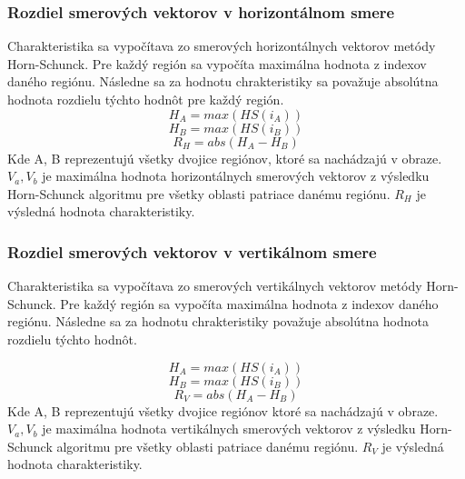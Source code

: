 \subsubsection{Rozdiel smerových vektorov v horizontálnom smere}
Charakteristika sa vypočítava zo smerových horizontálnych vektorov metódy Horn-Schunck.
Pre každý región sa vypočíta maximálna hodnota z indexov daného regiónu.
Následne sa za hodnotu chrakteristiky sa považuje absolútna hodnota rozdielu týchto hodnôt pre každý región.
\begin{equation}
  H_A = max(HS(i_A))
\end{equation}
\begin{equation}
  H_B = max(HS(i_B))
\end{equation}
\begin{equation}
  R_{H} = abs(H_A-H_B)
\end{equation}
Kde A, B reprezentujú všetky dvojice regiónov, ktoré sa nachádzajú v obraze.
\begin{math}V_a, V_b\end{math} je maximálna hodnota horizontálnych smerových vektorov z výsledku Horn-Schunck algoritmu pre všetky oblasti patriace danému regiónu.
\begin{math}R_{H}\end{math} je výsledná hodnota charakteristiky.

\subsubsection{Rozdiel smerových vektorov v vertikálnom smere}
Charakteristika sa vypočítava zo smerových vertikálnych vektorov metódy Horn-Schunck.
Pre každý región sa vypočíta maximálna hodnota z indexov daného regiónu.
Následne sa za hodnotu chrakteristiky považuje absolútna hodnota rozdielu týchto hodnôt.

\begin{equation}
  H_A = max(HS(i_A))
\end{equation}
\begin{equation}
  H_B = max(HS(i_B))
\end{equation}
\begin{equation}
  R_{V} = abs(H_A-H_B)
\end{equation}
Kde A, B reprezentujú všetky dvojice regiónov ktoré sa nachádzajú v obraze.
\begin{math}V_a, V_b\end{math} je maximálna hodnota vertikálnych smerových vektorov z výsledku Horn-Schunck algoritmu pre všetky oblasti patriace danému regiónu.
\begin{math}R_{V}\end{math} je výsledná hodnota charakteristiky.

